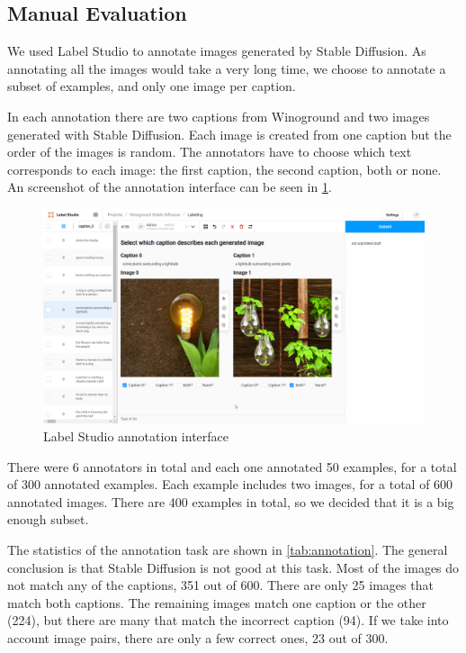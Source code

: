 \subsection{Manual Evaluation}

We used Label Studio \cite{labelstudio} to annotate images generated by Stable Diffusion. As annotating all the images would take a very long time, we choose to annotate a subset of examples, and only one image per caption. 

In each annotation there are two captions from Winoground and two images generated with Stable Diffusion. Each image is created from one caption but the order of the images is random. The annotators have to choose which text corresponds to each image: the first caption, the second caption, both or none. An screenshot of the annotation interface can be seen in \cref{fig:label-studio-annotation}.

\begin{figure}[ht]
    \centering
    \includegraphics[width=\linewidth]{images/annotation/label-studio-annotation.png}
    \caption{Label Studio annotation interface}
    \label{fig:label-studio-annotation}
\end{figure}

There were 6 annotators in total and each one annotated 50 examples, for a total of 300 annotated examples. Each example includes two images, for a total of 600 annotated images. There are 400 examples in total, so we decided that it is a big enough subset.

The statistics of the annotation task are shown in \cref{tab:annotation}. The general conclusion is that Stable Diffusion is not good at this task. Most of the images do not match any of the captions, 351 out of 600. There are only 25 images that match both captions. The remaining images match one caption or the other (224), but there are many that match the incorrect caption (94). If we take into account image pairs, there are only a few correct ones, 23 out of 300.

